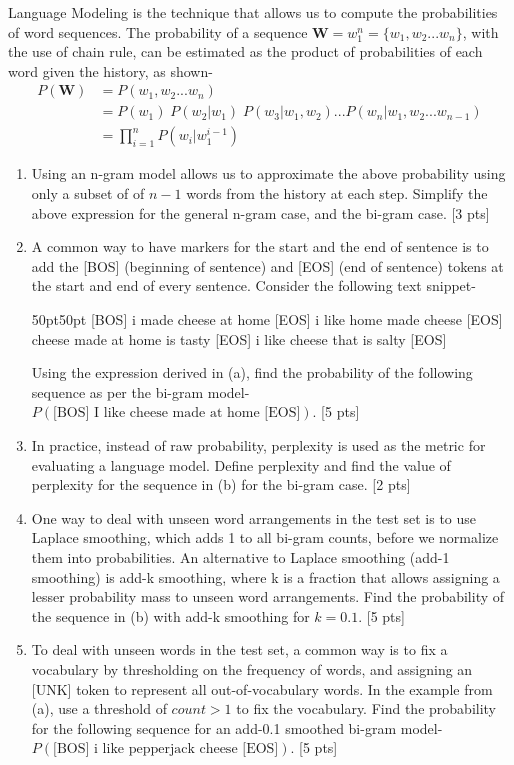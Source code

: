 Language Modeling is the technique that allows us to compute the probabilities of word sequences. The probability of a sequence $\textbf{W} = w_1^{n} = \{w_1, w_2 ... w_n\}$, with the use of chain rule, can be estimated as the product of probabilities of each word given the history, as shown-
\begin{align*}
    P(\textbf{W}) &= P(w_1, w_2 ... w_n)\\
    &= P(w_1) \; P(w_2 | w_1) \; P(w_3 | w_1, w_2) ... P(w_n | w_1, w_2 ... w_{n-1})\\
    &= \prod_{i=1}^{n} P(w_i | w_1^{i-1}) 
\end{align*}

\begin{enumerate}
    \item Using an n-gram model allows us to approximate the above probability using only a subset of of $n - 1$ words from the history at each step. Simplify the above expression for the general n-gram case, and the bi-gram case. [3 pts]
    \item A common way to have markers for the start and the end of sentence is to add the [BOS] (beginning of sentence) and [EOS] (end of sentence) tokens at the start and end of every sentence. Consider the following text snippet-
    \begin{adjustwidth}{50pt}{50pt}
    [BOS] i made cheese at home [EOS] \newline
    [BOS] i like home made cheese [EOS] \newline
    [BOS] cheese made at home is tasty [EOS] \newline
    [BOS] i like cheese that is salty [EOS] 
    \end{adjustwidth}
    Using the expression derived in (a), find the probability of the following sequence as per the bi-gram model- $P(\text{[BOS] I like cheese made at home [EOS]})$. [5 pts]
    \item In practice, instead of raw probability, perplexity is used as the metric for evaluating a language model. Define perplexity and find the value of perplexity for the sequence in (b) for the bi-gram case. [2 pts]
    \item One way to deal with unseen word arrangements in the test set is to use Laplace smoothing, which adds 1 to all bi-gram counts, before we normalize them into probabilities. An alternative to Laplace smoothing (add-1 smoothing) is add-k smoothing, where k is a fraction that allows assigning a lesser probability mass to unseen word arrangements. Find the probability of the sequence in (b) with add-k smoothing for $k=0.1$. [5 pts]
    \item To deal with unseen words in the test set, a common way is to fix a vocabulary by thresholding on the frequency of words, and assigning an [UNK] token to represent all out-of-vocabulary words. In the example from (a), use a threshold of $count > 1$ to fix the vocabulary. Find the probability for the following sequence for an add-0.1 smoothed bi-gram model- $P(\text{[BOS] i like pepperjack cheese [EOS]})$. [5 pts]
\end{enumerate}

